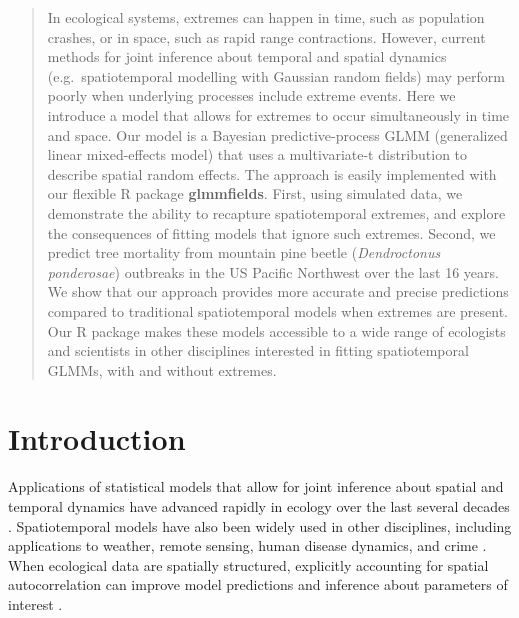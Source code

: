 \documentclass[12pt,english]{article}
\begin{document}
\begin{spacing}{1.9}
\linenumbers




\begin{abstract}

In ecological systems, extremes can happen
in time, such as population crashes,
or in space, such as rapid range contractions.
However, current methods for
joint inference about temporal and spatial dynamics
(e.g.\ spatiotemporal modelling with Gaussian random fields)
may perform poorly when
underlying processes include extreme events.
Here we introduce a model that allows for extremes
to occur simultaneously in time and space.
Our model is a Bayesian predictive-process GLMM
(generalized linear mixed-effects model)
that uses a multivariate-t distribution to describe spatial random effects.
The approach is easily implemented with
our flexible R package \textbf{glmmfields}.
First, using simulated data,
we demonstrate the ability to recapture spatiotemporal extremes,
and explore the consequences of fitting models that ignore such extremes.
Second, we predict
tree mortality from mountain pine beetle (\emph{Dendroctonus ponderosae})
outbreaks in the US Pacific Northwest over the last 16 years.
We show that our approach provides
more accurate and precise predictions
compared to traditional spatiotemporal models
when extremes are present.
Our R package makes these models
accessible to a wide range of ecologists
and scientists in other disciplines interested in
fitting spatiotemporal GLMMs, with and without extremes.
\end{abstract}

%
%

\section{Introduction}

Applications of statistical models that allow for joint inference about spatial
and temporal dynamics have advanced rapidly in ecology over the last several
decades \citep[e.g.][]{bascompte1995, latimer2009, conn2015}. Spatiotemporal
models have also been widely used in other disciplines, including applications
to weather, remote sensing, human disease dynamics, and crime
\citep{cressie2011}. When ecological data are spatially structured, explicitly
accounting for spatial autocorrelation can improve model predictions and
inference about parameters of interest \citep[e.g.][]{thorson2015}.


\end{spacing}
\end{document}
